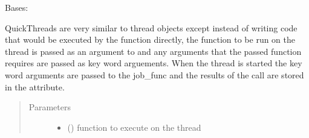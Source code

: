 \documentclass[letterpaper,10pt,english]{sphinxmanual}
\begin{document}

\begin{fulllineitems}
\label{\detokenize{polo.threads:polo.threads.thread.QuickThread}}
Bases: {\hyperref[\detokenize{polo.threads:polo.threads.thread.thread}]{}}

QuickThreads are very similar
to thread objects except instead of writing code that would be
executed by the  function directly, the function to be run
on the thread is passed as an argument to  and any arguments
that the passed function requires are passed as key word arguements.
When the thread is started the key word arguments are passed to the
job\_func and the results of the call are stored in the  attribute.

\begin{sphinxVerbatim}[commandchars=\\\{\}]
       
    
    
\end{sphinxVerbatim}
\begin{quote}\begin{description}
\item[{Parameters}] \leavevmode\begin{itemize}
\item {} 
 (\sphinxstyleliteralemphasis{\sphinxupquote{{[}}}\sphinxstyleliteralemphasis{\sphinxupquote{{]}}}) \textendash{} function to execute on the thread


\end{itemize}
\end{description}
\end{quote}
\end{fulllineitems}
\end{document}
